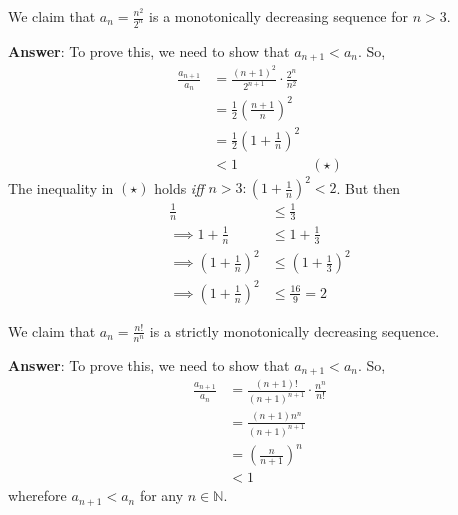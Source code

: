 \begin{exm}\label{exm-monotonicity-sequences:1}
	We claim that $a_n=\tfrac{n^2}{2^n}$ is a monotonically decreasing sequence for $n>3$.
	\begin{flushleft}
		\textbf{Answer}: To prove this, we need to show that $a_{n+1}<a_n$. So,
		\begin{align*}
			\frac{a_{n+1}}{a_n} & = \frac{(n+1)^2}{2^{n+1}}\cdot\frac{2^n}{n^2}           \\
			                    & = \frac{1}{2}\left(\frac{n+1}{n}\right)^2               \\
			                    & = \frac{1}{2}\left(1+\frac{1}{n}\right)^2               \\
			                    & < 1                                           & (\star)
		\end{align*}
		The inequality in $(\star)$ holds \textit{iff} $n>3:\left(1+\tfrac{1}{n}\right)^2<2$.
		But then
		\begin{align*}
			\frac{1}{n}                  & \leq \frac{1}{3}                  \\
			\implies
			1+\frac{1}{n}                & \leq 1+\frac{1}{3}                \\
			\implies
			\left(1+\frac{1}{n}\right)^2 & \leq \left(1+\frac{1}{3}\right)^2 \\
			\implies
			\left(1+\frac{1}{n}\right)^2 & \leq \frac{16}{9} = 2
		\end{align*}
	\end{flushleft}
\end{exm}

\begin{exm}\label{exm-monotonicity-sequences:2}
	We claim that $a_n=\tfrac{n!}{n^n}$ is a strictly monotonically decreasing sequence.
	\begin{flushleft}
		\textbf{Answer}: To prove this, we need to show that $a_{n+1}<a_n$. So,
		\begin{align*}
			\frac{a_{n+1}}{a_n} & = \frac{(n+1)!}{(n+1)^{n+1}}\cdot\frac{n^n}{n!} \\
			                    & = \frac{(n+1)n^n}{(n+1)^{n+1}}                  \\
			                    & = \left(\frac{n}{n+1}\right)^n                  \\
			                    & < 1
		\end{align*}
		wherefore $a_{n+1}<a_n$ for any $n\in\mathbb{N}$.
	\end{flushleft}
\end{exm}

